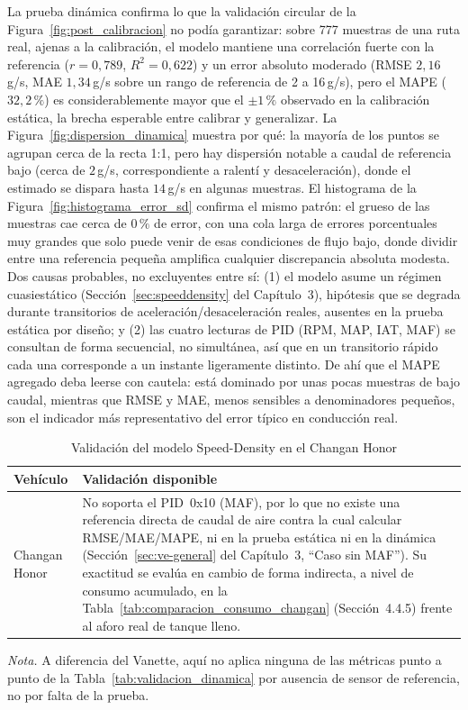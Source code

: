 La prueba dinámica confirma lo que la validación circular de la Figura~\ref{fig:post_calibracion} no podía garantizar: sobre 777 muestras de una ruta real, ajenas a la calibración, el modelo mantiene una correlación fuerte con la referencia ($r=0{,}789$, $R^2=0{,}622$) y un error absoluto moderado (RMSE $2{,}16$\,g/s, MAE $1{,}34$\,g/s sobre un rango de referencia de 2 a 16\,g/s), pero el MAPE ($32{,}2\,\%$) es considerablemente mayor que el $\pm 1\,\%$ observado en la calibración estática, la brecha esperable entre calibrar y generalizar. La Figura~\ref{fig:dispersion_dinamica} muestra por qué: la mayoría de los puntos se agrupan cerca de la recta 1:1, pero hay dispersión notable a caudal de referencia bajo (cerca de $2$\,g/s, correspondiente a ralentí y desaceleración), donde el estimado se dispara hasta $14$\,g/s en algunas muestras. El histograma de la Figura~\ref{fig:histograma_error_sd} confirma el mismo patrón: el grueso de las muestras cae cerca de $0\,\%$ de error, con una cola larga de errores porcentuales muy grandes que solo puede venir de esas condiciones de flujo bajo, donde dividir entre una referencia pequeña amplifica cualquier discrepancia absoluta modesta. Dos causas probables, no excluyentes entre sí: (1) el modelo asume un régimen cuasiestático (Sección~\ref{sec:speeddensity} del Capítulo~3), hipótesis que se degrada durante transitorios de aceleración/desaceleración reales, ausentes en la prueba estática por diseño; y (2) las cuatro lecturas de PID (RPM, MAP, IAT, MAF) se consultan de forma secuencial, no simultánea, así que en un transitorio rápido cada una corresponde a un instante ligeramente distinto. De ahí que el MAPE agregado deba leerse con cautela: está dominado por unas pocas muestras de bajo caudal, mientras que RMSE y MAE, menos sensibles a denominadores pequeños, son el indicador más representativo del error típico en conducción real.

\begin{table}[H]
	\centering
	\captionsetup{labelformat=simple, labelsep=newline, textfont=it, labelfont=bf, justification=raggedright, singlelinecheck=false}
	\caption{Validación del modelo Speed-Density en el Changan Honor}
	\label{tab:validacion_changan_sd}
	\begin{tabularx}{\textwidth}{>{\centering\arraybackslash}p{3cm} X}
		\toprule
		\rowcolor[rgb]{0.851, 0.851, 0.851}
		Vehículo & Validación disponible \\
		\midrule
		Changan Honor & No soporta el PID~0x10 (MAF), por lo que no existe una referencia directa de caudal de aire contra la cual calcular RMSE/MAE/MAPE, ni en la prueba estática ni en la dinámica (Sección~\ref{sec:ve-general} del Capítulo~3, ``Caso sin MAF''). Su exactitud se evalúa en cambio de forma indirecta, a nivel de consumo acumulado, en la Tabla~\ref{tab:comparacion_consumo_changan} (Sección~4.4.5) frente al aforo real de tanque lleno. \\
		\bottomrule
	\end{tabularx}
	\vskip 0.15cm
	{\footnotesize \textit{Nota.} A diferencia del Vanette, aquí no aplica ninguna de las métricas punto a punto de la Tabla~\ref{tab:validacion_dinamica} por ausencia de sensor de referencia, no por falta de la prueba.}
\end{table}

